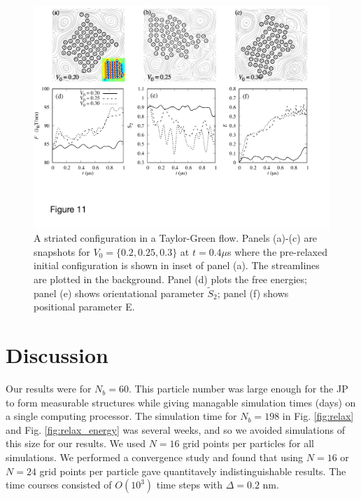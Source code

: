 \documentclass[prb,preprint,showpacs,preprintnumbers,amsmath,amssymb,longbibliography]{revtex4-1}
\begin{document}
\begin{figure}
  \begin{center}
\includegraphics[width=1.0\textwidth]{Figures/Figure11.pdf}            
  \end{center}
  \vspace{-20pt}  
  \caption{\label{fig:BC3_TG} A striated configuration in a Taylor-Green flow. Panels (a)-(c) are snapshots for $V_0=\{0.2, 0.25, 0.3\}$ at $t=0.4\mu$s where the pre-relaxed initial configuration is shown in inset of panel (a). The streamlines are plotted in the background.
Panel (d) plots the free energies; panel (e) shows orientational parameter $\tilde{S}_2$; panel (f) shows positional parameter E.
}
\end{figure}



\section{Discussion}
Our results were for $N_b = 60$.  This particle number was large enough for the JP to form
measurable structures while giving managable simulation times (days) on a single computing processor.
The simulation time for $N_b = 198$ in Fig. \ref{fig:relax} and Fig. \ref{fig:relax_energy}
was several weeks, and so we avoided simulations of this size for our results.
We used $N = 16$ grid points per particles for all simulations.  We performed a convergence study
and found that using $N = 16$ or $N = 24$ grid points per particle gave quantitavely indistinguishable
results.  The time courses consisted of $O(10^3)$ time steps with $\Delta = 0.2$ nm. 
\end{document}
